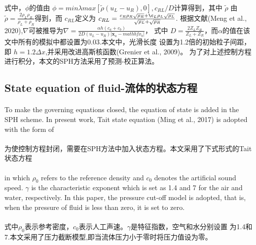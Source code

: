 \documentclass[UTF8]{ctexart}
\begin{document}
{{\paragraph{\quad}式中，$\phi$的值由 $\phi = min{λmax[\tilde{ρ}(u_L-u_R), 0], c_{RL}/D}$计算得到，其中 $\tilde{\rho}$
                由 $\tilde{ρ} = \frac{2 \rho_L \rho_R}{\rho_L + \rho_R} $得到，而 $c_{RL}$定义为
                $c_{RL} = \frac{c_R \rho_R \sqrt{\rho_R} + \c_L \rho_L \sqrt{\rho_L}}{\sqrt{\rho_L}+\sqrt{\rho_R}}$.
                根据文献(Meng et al., 2020),$\nabla$可被推导为$\nabla =\frac{ \alpha h (c_a+c_b) }{2D(u_L-u_R)|\mathbf{x}_a-mathbf{x}_b|}$，
                式中 $D = \frac{2Z_L Z_R}{Z_L + Z_R}$，而$\alpha$的值在该文中所有的模拟中都设置为0.03.本文中，光滑长度
                设置为1.2倍的初始粒子间距，即 $h = 1.2 \Delta x$,并采用改进高斯核函数(Grenier et al., 2009)。
                为了对上述控制方程进行积分，本文的SPH方法采用了预测-校正算法。


\subsection{State equation of fluid-流体的状态方程}
\paragraph{\quad}To make the governing equations closed, the equation of state is added
                in the SPH scheme. In present work, Tait state equation (Ming et al., 2017) 
                is adopted with the form of
\paragraph{\quad}为使控制方程封闭，需要在SPH方法中加入状态方程。本文采用了下式形式的Tait状态方程


\paragraph{\quad}in which $\rho_0$ refers to the reference density and $c_0$ denotes the 
                artificial sound speed. $\gamma$ is the characteristic exponent which is 
                set as 1.4 and 7 for the air and water, respectively. In this paper, 
                the pressure cut-off model is adopted, that is, when the pressure of 
                fluid is less than zero, it is set to zero.
\paragraph{\quad}式中$\rho_0$表示参考密度，$c_0$表示人工声速。$\gamma$是特征指数，空气和水分别设置
                为1.4和7.本文采用了压力截断模型,即当流体压力小于零时将压力值设为零。

}}
\end{document}
